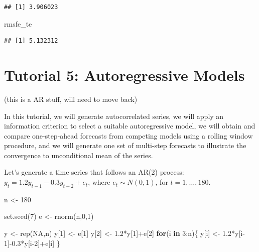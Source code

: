 \documentclass[
  12pt,
  oneside]{book}
\newenvironment{Shaded}{\begin{snugshade}}{\end{snugshade}}
\newcommand{\ConstantTok}[1]{\textcolor[rgb]{0.00,0.00,0.00}{#1}}
\newcommand{\ControlFlowTok}[1]{\textcolor[rgb]{0.13,0.29,0.53}{\textbf{#1}}}
\newcommand{\DecValTok}[1]{\textcolor[rgb]{0.00,0.00,0.81}{#1}}
\newcommand{\FloatTok}[1]{\textcolor[rgb]{0.00,0.00,0.81}{#1}}
\newcommand{\FunctionTok}[1]{\textcolor[rgb]{0.00,0.00,0.00}{#1}}
\newcommand{\NormalTok}[1]{#1}
\newcommand{\OtherTok}[1]{\textcolor[rgb]{0.56,0.35,0.01}{#1}}
\newcommand{\SpecialCharTok}[1]{\textcolor[rgb]{0.00,0.00,0.00}{#1}}
\begin{document}
\begin{verbatim}
## [1] 3.906023
\end{verbatim}

\begin{Shaded}
\begin{Highlighting}[]
\NormalTok{rmsfe\_te}
\end{Highlighting}
\end{Shaded}

\begin{verbatim}
## [1] 5.132312
\end{verbatim}

\hypertarget{tutorial-5-autoregressive-models}{%
\chapter*{Tutorial 5: Autoregressive Models}\label{tutorial-5-autoregressive-models}}

(this is a AR stuff, will need to move back)

In this tutorial, we will generate autocorrelated series, we will apply an information criterion to select a suitable autoregressive model, we will obtain and compare one-step-ahead forecasts from competing models using a rolling window procedure, and we will generate one set of multi-step forecasts to illustrate the convergence to unconditional mean of the series.

Let's generate a time series that follows an AR(2) process: \(y_{t} = 1.2y_{t-1}-0.3y_{t-2}+e_{t}\), where \(e_{t} \sim N(0,1)\), for \(t=1,\ldots,180\).

\begin{Shaded}
\begin{Highlighting}[]
\NormalTok{n }\OtherTok{\textless{}{-}} \DecValTok{180}

\FunctionTok{set.seed}\NormalTok{(}\DecValTok{7}\NormalTok{)}
\NormalTok{e }\OtherTok{\textless{}{-}} \FunctionTok{rnorm}\NormalTok{(n,}\DecValTok{0}\NormalTok{,}\DecValTok{1}\NormalTok{)}

\NormalTok{y }\OtherTok{\textless{}{-}} \FunctionTok{rep}\NormalTok{(}\ConstantTok{NA}\NormalTok{,n)}
\NormalTok{y[}\DecValTok{1}\NormalTok{] }\OtherTok{\textless{}{-}}\NormalTok{ e[}\DecValTok{1}\NormalTok{]}
\NormalTok{y[}\DecValTok{2}\NormalTok{] }\OtherTok{\textless{}{-}} \FloatTok{1.2}\SpecialCharTok{*}\NormalTok{y[}\DecValTok{1}\NormalTok{]}\SpecialCharTok{+}\NormalTok{e[}\DecValTok{2}\NormalTok{]}
\ControlFlowTok{for}\NormalTok{(i }\ControlFlowTok{in} \DecValTok{3}\SpecialCharTok{:}\NormalTok{n)\{}
\NormalTok{  y[i] }\OtherTok{\textless{}{-}} \FloatTok{1.2}\SpecialCharTok{*}\NormalTok{y[i}\DecValTok{{-}1}\NormalTok{]}\SpecialCharTok{{-}}\FloatTok{0.3}\SpecialCharTok{*}\NormalTok{y[i}\DecValTok{{-}2}\NormalTok{]}\SpecialCharTok{+}\NormalTok{e[i]}
\NormalTok{\}}
\end{Highlighting}
\end{Shaded}
\end{document}
